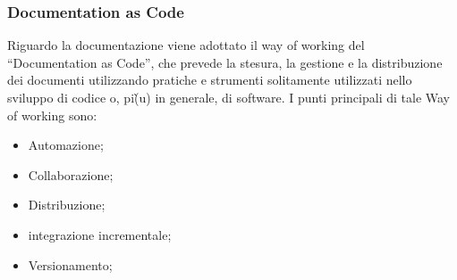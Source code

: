 \subsubsection{Documentation as Code}
Riguardo la documentazione viene adottato il way of working del ``Documentation as Code'', che prevede la stesura, la gestione e la distribuzione dei documenti utilizzando pratiche e strumenti solitamente utilizzati nello sviluppo di codice o, pi\`(u) in generale, di software. I punti principali di tale Way of working sono:
\begin{itemize}
    \item Automazione;
    \item Collaborazione;
    \item Distribuzione;
    \item integrazione incrementale;
    \item Versionamento;


\end{itemize}
